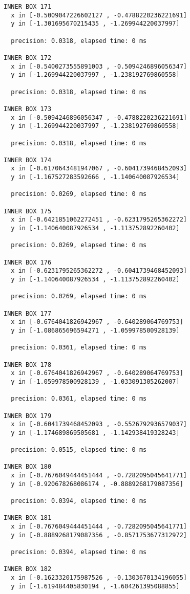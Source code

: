 \begin{verbatim}
INNER BOX 171
  x in [-0.5009047226602127 , -0.4788220236221691]
  y in [-1.301695670215435 , -1.269944220037997]

  precision: 0.0318, elapsed time: 0 ms

INNER BOX 172
  x in [-0.5400273555891003 , -0.5094246896056347]
  y in [-1.269944220037997 , -1.238192769860558]

  precision: 0.0318, elapsed time: 0 ms

INNER BOX 173
  x in [-0.5094246896056347 , -0.4788220236221691]
  y in [-1.269944220037997 , -1.238192769860558]

  precision: 0.0318, elapsed time: 0 ms

INNER BOX 174
  x in [-0.6170643481947067 , -0.6041739468452093]
  y in [-1.167527283592666 , -1.140640087926534]

  precision: 0.0269, elapsed time: 0 ms

INNER BOX 175
  x in [-0.6421851062272451 , -0.6231795265362272]
  y in [-1.140640087926534 , -1.113752892260402]

  precision: 0.0269, elapsed time: 0 ms

INNER BOX 176
  x in [-0.6231795265362272 , -0.6041739468452093]
  y in [-1.140640087926534 , -1.113752892260402]

  precision: 0.0269, elapsed time: 0 ms

INNER BOX 177
  x in [-0.6764041826942967 , -0.640289064769753]
  y in [-1.086865696594271 , -1.059978500928139]

  precision: 0.0361, elapsed time: 0 ms

INNER BOX 178
  x in [-0.6764041826942967 , -0.640289064769753]
  y in [-1.059978500928139 , -1.033091305262007]

  precision: 0.0361, elapsed time: 0 ms

INNER BOX 179
  x in [-0.6041739468452093 , -0.5526792936579037]
  y in [-1.174689869505681 , -1.142938419328243]

  precision: 0.0515, elapsed time: 0 ms

INNER BOX 180
  x in [-0.7676049444451444 , -0.7282095045641771]
  y in [-0.920678268086174 , -0.8889268179087356]

  precision: 0.0394, elapsed time: 0 ms

INNER BOX 181
  x in [-0.7676049444451444 , -0.7282095045641771]
  y in [-0.8889268179087356 , -0.8571753677312972]

  precision: 0.0394, elapsed time: 0 ms

INNER BOX 182
  x in [-0.1623320175987526 , -0.1303670134196055]
  y in [-1.619484405830194 , -1.604261395088855]


\end{verbatim}
